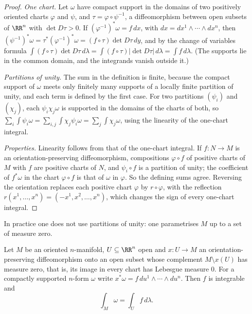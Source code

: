 \begin{proof}
\emph{One chart.} Let $\omega$ have compact support in the domains of two positively oriented charts $\varphi$ and $\psi$, and $\tau = \varphi \circ \psi^{-1}$, a diffeomorphism between open subsets of
$\RR^n$ with $\det D\tau > 0$. If $(\varphi^{-1})^*\omega = f\,dx$, with $dx = dx^1 \wedge \cdots \wedge dx^n$, then $(\psi^{-1})^*\omega = \tau^*(\varphi^{-1})^*\omega = (f \circ \tau)\det D\tau\,dy$, and by the
change of variables formula $\int(f \circ \tau)\det D\tau\,d\lambda = \int(f \circ \tau)|\det D\tau|\,d\lambda = \int f\,d\lambda$. (The supports lie in the common domain, and the integrands vanish
outside it.)

\emph{Partitions of unity.} The sum in the definition is finite, because the compact support of $\omega$ meets only finitely many supports of a locally finite partition of unity, and
each term is defined by the first case. For two partitions $(\psi_i)$ and $(\chi_j)$, each $\psi_i\chi_j\omega$ is supported in the domains of the charts of both, so
$\sum_i\int\psi_i\omega = \sum_{i,j}\int\chi_j\psi_i\omega = \sum_j\int\chi_j\omega$, using the linearity of the one-chart integral.

\emph{Properties.} Linearity follows from that of the one-chart integral. If $f \colon N \to M$ is an orientation-preserving diffeomorphism, compositions $\varphi \circ f$ of positive charts of
$M$ with $f$ are positive charts of $N$, and $\psi_i \circ f$ is a partition of unity; the coefficient of $f^*\omega$ in the chart $\varphi \circ f$ is that of $\omega$ in $\varphi$. So the defining sums
agree. Reversing the orientation replaces each positive chart $\varphi$ by $r \circ \varphi$, with the reflection $r(x^1, \ldots, x^n) = (-x^1, x^2, \ldots, x^n)$, which changes the sign of every
one-chart integral.
\end{proof}

In practice one does not use partitions of unity: one parametrises $M$ up to a set of measure zero.

\begin{proposition}\label{differential-forms:proposition-integral-parametrisation}
Let $M$ be an oriented $n$-manifold, $U \subseteq \RR^n$ open and $x \colon U \to M$ an orientation-preserving diffeomorphism onto an open subset whose complement $M \setminus x(U)$ has
measure zero, that is, its image in every chart has Lebesgue measure $0$. For a compactly supported $n$-form $\omega$ write $x^*\omega = f\,du^1 \wedge \cdots \wedge du^n$. Then $f$ is integrable
and
\[
\int_M\omega = \int_Uf\,d\lambda .
\]
\end{proposition}

